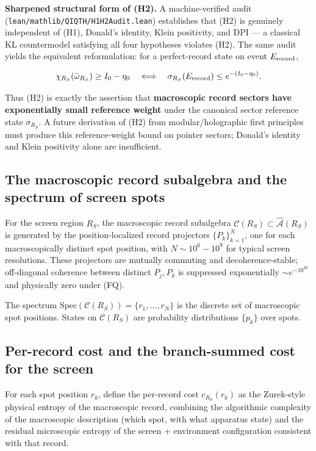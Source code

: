 \documentclass[11pt,a4paper]{article}
\begin{document}
\textbf{Sharpened structural form of (H2).} A machine-verified audit (\texttt{lean/mathlib/QIQTH/H1H2Audit.lean}) establishes that (H2) is genuinely independent of (H1), Donald's identity, Klein positivity, and DPI — a classical KL countermodel satisfying all four hypotheses violates (H2). The same audit yields the equivalent reformulation: for a perfect-record state on event $E_{\rm record}$,

\[
\chi_{R_S}(\bar\omega_{R_S}) \ge I_0 - \eta_0 \quad \Longleftrightarrow \quad \sigma_{R_S}(E_{\rm record}) \le e^{-(I_0 - \eta_0)}.
\]

Thus (H2) is exactly the assertion that \textbf{macroscopic record sectors have exponentially small reference weight} under the canonical sector reference state $\sigma_{R_S}$. A future derivation of (H2) from modular/holographic first principles must produce this reference-weight bound on pointer sectors; Donald's identity and Klein positivity alone are insufficient.

\subsection{The macroscopic record subalgebra and the spectrum of screen spots}

For the screen region $R_S$, the macroscopic record subalgebra $\mathcal{C}(R_S) \subset \hat{\mathcal{A}}(R_S)$ is generated by the position-localized record projectors $\{P_k\}_{k=1}^N$, one for each macroscopically distinct spot position, with $N \sim 10^6 - 10^9$ for typical screen resolutions. These projectors are mutually commuting and decoherence-stable; off-diagonal coherence between distinct $P_j, P_k$ is suppressed exponentially $\sim e^{-10^{20}}$ and physically zero under (FQ).

The spectrum $\mathrm{Spec}(\mathcal{C}(R_S)) = \{r_1, \ldots, r_N\}$ is the discrete set of macroscopic spot positions. States on $\mathcal{C}(R_S)$ are probability distributions $\{p_k\}$ over spots.

\subsection{Per-record cost and the branch-summed cost for the screen}

For each spot position $r_k$, define the per-record cost $c_{R_S}(r_k)$ as the Zurek-style physical entropy of the macroscopic record, combining the algorithmic complexity of the macroscopic description (which spot, with what apparatus state) and the residual microscopic entropy of the screen + environment configuration consistent with that record.
\end{document}
